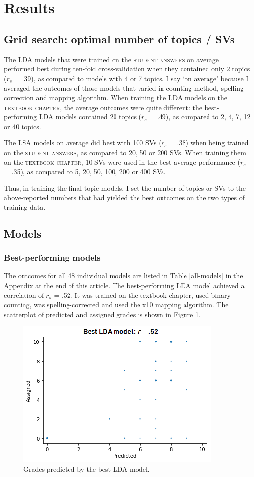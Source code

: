 \documentclass[a4paper,10pt,twoside]{article}
\begin{document}
\section{Results}

\subsection{Grid search: optimal number of topics / SVs}
The LDA models that were trained on the \textsc{student answers} on average performed best during ten-fold cross-validation when they contained only 2 topics ($\textit{r}_s$ = .39), as compared to models with 4 or 7 topics. I say `on average' because I averaged the outcomes of those models that varied in counting method, spelling correction and mapping algorithm. When training the LDA models on the \textsc{textbook chapter}, the average outcomes were quite different: the best-performing LDA models contained 20 topics ($\textit{r}_s$ = .49), as compared to 2, 4, 7, 12 or 40 topics.

The LSA models on average did best with 100 SVs ($\textit{r}_s$ = .38) when being trained on the \textsc{student answers}, as compared to 20, 50 or 200 SVs. When training them on the \textsc{textbook chapter}, 10 SVs were used in the best average performance ($\textit{r}_s$ = .35), as compared to 5, 20, 50, 100, 200 or 400 SVs.

Thus, in training the final topic models, I set the number of topics or SVs to the above-reported numbers that had yielded the best outcomes on the two types of training data.

\subsection{Models}
\label{sec:averageoutcomes}

\subsubsection{Best-performing models}
The outcomes for all 48 individual models are listed in Table \ref{all-models} in the Appendix at the end of this article. The best-performing LDA model achieved a correlation of $\textit{r}_s$ = .52. It was trained on the textbook chapter, used binary counting, was spelling-corrected and used the x10 mapping algorithm. The scatterplot of predicted and assigned grades is shown in Figure \ref{lda}.

\begin{figure}[h]
\centering
\includegraphics[width=0.5\linewidth]{"Best LDA model"}
\caption{Grades predicted by the best LDA model.}
\label{lda}
\end{figure}
\end{document}

